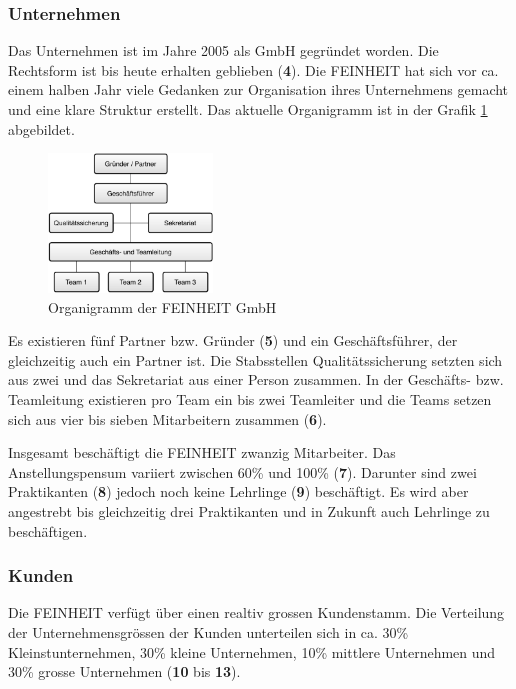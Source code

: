 \subsubsection{Unternehmen}
Das Unternehmen ist im Jahre 2005 als GmbH gegründet worden. Die Rechtsform
ist bis heute erhalten geblieben (\textbf{4}). Die FEINHEIT hat sich vor ca. 
einem halben Jahr viele Gedanken zur Organisation ihres Unternehmens gemacht 
und eine klare Struktur erstellt. Das aktuelle Organigramm ist in der Grafik 
\ref{pic:organigramm_feinheit} abgebildet.

\begin{figure}[h!]
\begin{center}
\includegraphics[width=0.39\textwidth,angle=0]{./bilder/analyse/organigramm_feinheit.pdf}
\caption[Organigramm der FEINHEIT GmbH]{Organigramm der FEINHEIT GmbH\footnotemark}
\label{pic:organigramm_feinheit}
\end{center}
\end{figure}

\clearpage

Es existieren fünf Partner bzw. Gründer (\textbf{5}) und ein Geschäftsführer,
der gleichzeitig auch ein Partner ist. Die Stabsstellen Qualitätssicherung setzten
sich aus zwei und das Sekretariat aus einer Person zusammen. In der Geschäfts-
bzw. Teamleitung existieren pro Team ein bis zwei Teamleiter und die Teams
setzen sich aus vier bis sieben Mitarbeitern zusammen (\textbf{6}).

Insgesamt beschäftigt die FEINHEIT zwanzig Mitarbeiter. Das Anstellungspensum
variiert zwischen 60\% und 100\% (\textbf{7}). Darunter sind zwei Praktikanten (\textbf{8})
jedoch noch keine Lehrlinge (\textbf{9}) beschäftigt. Es wird aber angestrebt
bis gleichzeitig drei Praktikanten und in Zukunft auch Lehrlinge zu beschäftigen.

\subsubsection{Kunden}
Die FEINHEIT verfügt über einen realtiv grossen Kundenstamm. Die Verteilung der
Unternehmensgrössen der Kunden unterteilen sich in ca. 30\% Kleinstunternehmen,
30\% kleine Unternehmen, 10\% mittlere Unternehmen und 30\% grosse Unternehmen 
(\textbf{10} bis \textbf{13}).

